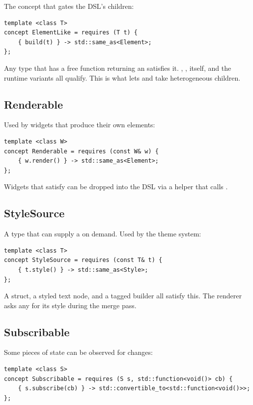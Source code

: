 The concept that gates the DSL's children:

\begin{lstlisting}
template <class T>
concept ElementLike = requires (T t) {
    { build(t) } -> std::same_as<Element>;
};
\end{lstlisting}

Any type that has a free function  returning an
 satisfies it. , ,
 itself, and the runtime variants all qualify.
This is what lets  and  take
heterogeneous children.

\subsection*{Renderable}

Used by widgets that produce their own elements:

\begin{lstlisting}
template <class W>
concept Renderable = requires (const W& w) {
    { w.render() } -> std::same_as<Element>;
};
\end{lstlisting}

Widgets that satisfy  can be dropped into the
DSL via a  helper that calls
.

\subsection*{StyleSource}

A type that can supply a  on demand. Used by the
theme system:

\begin{lstlisting}
template <class T>
concept StyleSource = requires (const T& t) {
    { t.style() } -> std::same_as<Style>;
};
\end{lstlisting}

A  struct, a styled text node, and a tagged builder
all satisfy this. The renderer asks any  for
its style during the merge pass.

\subsection*{Subscribable}

Some pieces of state can be observed for changes:

\begin{lstlisting}
template <class S>
concept Subscribable = requires (S s, std::function<void()> cb) {
    { s.subscribe(cb) } -> std::convertible_to<std::function<void()>>;
};
\end{lstlisting}

